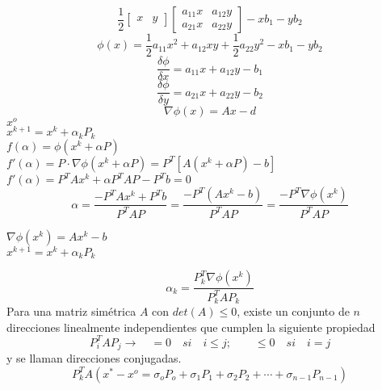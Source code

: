 \begin{displaymath}
\frac{1}{2}\begin{bmatrix}
x & y \end{bmatrix}\begin{bmatrix}
a_{11}x & a_{12}y \\ a_{21}x & a_{22}y\end{bmatrix}- xb_1 - yb_2
\end{displaymath}
\begin{displaymath}
\phi(x)=\frac{1}{2}a_{11}x^2+a_{12}xy+\frac{1}{2}a_{22}y^2-xb_1-yb_2
\end{displaymath}
\begin{displaymath}
\frac{\delta\phi}{\delta x}=a_{11}x+a_{12}y-b_1
\end{displaymath}
\begin{displaymath}
\frac{\delta\phi}{\delta y}=a_{21}x+a_{22}y-b_2
\end{displaymath}
\begin{displaymath}
\boxed{\nabla\phi(x)=Ax-d}
\end{displaymath}
$x^o$\\
$x^{k+1}=x^k+\alpha_kP_k$\\
$f(\alpha)=\phi(x^k+\alpha P)$\\
$f'(\alpha)=P\cdot\nabla\phi(x^k+\alpha P)=P^T[A(x^k+\alpha P)-b]$\\
$f'(\alpha)=P^TAx^k+\alpha P^TAP-P^Tb=0$
\begin{displaymath}
\alpha=\frac{-P^TAx^k+P^Tb}{P^TAP}=\frac{-P^T(Ax^k-b)}{P^TAP}=\frac{-P^T\nabla\phi(x^k)}{P^TAP}
\end{displaymath}
\begin{center}
$\nabla\phi(x^k)=Ax^k-b$\\
$x^{k+1}=x^k+\alpha_kP_k$
\end{center}
\begin{displaymath}
\alpha_k=\frac{P_k^T\nabla\phi(x^k)}{P_k^TAP_k}
\end{displaymath}
Para una matriz sim\'etrica $A$ con $det(A)\leq 0$, existe un conjunto de $n$ direcciones linealmente independientes que cumplen la siguiente propiedad
\begin{displaymath}
P_i^TAP_j\rightarrow\quad =0\quad si\quad i\leq j ;\qquad \leq 0 \quad si\quad i=j
\end{displaymath}
y se llaman direcciones conjugadas.
\begin{displaymath}
P_k^TA(x^*-x^o=\sigma_oP_o+\sigma_1P_1+\sigma_2P_2+\cdots+\sigma_{n-1}P_{n-1})
\end{displaymath}
